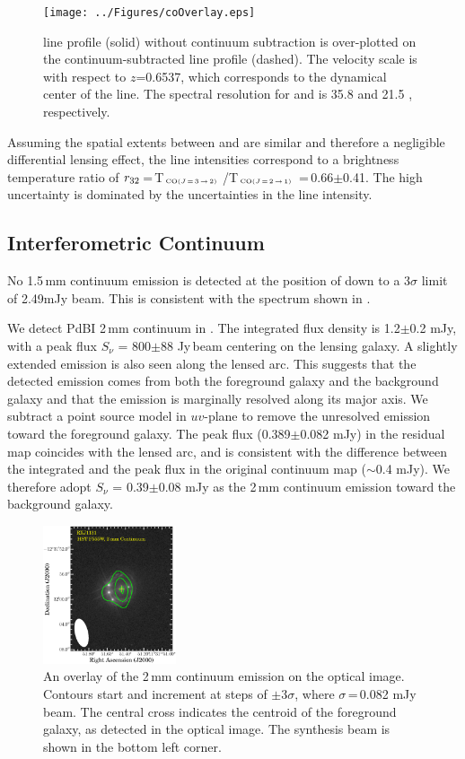 \documentclass[]{emulateapj}
\begin{document}
\begin{figure}[!Htbp]
\centering
\texttt{[image: ../Figures/coOverlay.eps]}
\caption{
\carma \cco line profile (solid) without continuum subtraction is
over-plotted on the continuum-subtracted \bco line profile (dashed).
The velocity scale is with respect to $z$=0.6537, which corresponds to the
dynamical center of the \bco line. The spectral resolution for \cco and \bco
is 35.8 \kms and 21.5 \kms, respectively.
 \label{fig:co32spec}}
\end{figure}

Assuming the spatial extents between \bco and \cco are similar and therefore
a negligible differential lensing effect, the line intensities
correspond to a brightness temperature ratio of
$r_{\rm 32}$\,=\,T$_{\tiny \mbox{CO($J$\,=\,3\,$\rightarrow$\,2) }}$/T$_{\tiny \mbox{CO($J$\,=\,2\,$\rightarrow$\,1) }}$\,=\,0.66$\pm$0.41.
The high uncertainty is dominated by the uncertainties in the \cco line
intensity.

\subsection{Interferometric Continuum} %
No 1.5\,mm continuum emission is detected at the position of \cco
down to a 3$\sigma$ limit of 2.49mJy beam\pmOne.
This is consistent with the spectrum shown in .

We detect PdBI 2\,mm continuum in \Fig{2mm}. The integrated flux density is
1.2$\pm$0.2 mJy, with a peak flux $S_\nu$ = 800$\pm$88 \micron Jy\,beam\pmOne
centering on the lensing galaxy. A slightly extended emission is also seen
along the lensed arc. This suggests that the detected emission comes from
both the foreground galaxy and the background galaxy and that the
emission is marginally resolved along its major axis.
We subtract a point source model in $uv$-plane to remove the unresolved
emission toward the foreground galaxy. The peak flux (0.389$\pm$0.082 mJy)
in the residual map coincides with the lensed arc, and is consistent with
the difference between the integrated and the peak flux in the
original continuum map ($\sim$0.4 mJy). We therefore adopt
$S_\nu$ = 0.39$\pm$0.08 mJy as the 2\,mm continuum emission toward
the background galaxy.

\begin{figure}[!htbp]
\centering
\includegraphics[width=0.35\textwidth]{../Figures/F555W_ContPdBI.eps}
\caption{
An overlay of the 2\,mm continuum emission on the optical image. Contours start and increment at steps of $\pm$3$\sigma$, where $\sigma$\,=\,0.082 mJy
beam\pmOne. The central cross indicates the centroid of the foreground galaxy,
as detected in the optical image. The synthesis beam is shown in the bottom left corner.
\label{fig:2mm}}
\end{figure}
\end{document}

